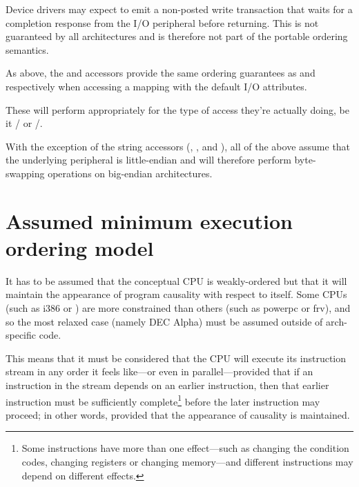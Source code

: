 \begin{description}
	Device drivers may expect  to emit a non-posted write
	transaction that waits for a completion response from the I/O
	peripheral before returning.
	This is not guaranteed by all architectures and is therefore not
	part of the portable ordering semantics.

 \item[\tco{insX()}, \tco{outsX()}:]

	As above, the  and  accessors provide the same
	ordering guarantees as  and  respectively
	when accessing a mapping with the default I/O attributes.

 \item[\tco{ioreadX()}, \tco{iowriteX()}:]

	These will perform appropriately for the type of access they're actually
	doing, be it / or /.
\end{description}

With the exception of the string accessors (, ,
 and ), all of the above assume that the underlying
peripheral is little-endian and will therefore perform byte-swapping
operations on big-endian architectures.


\section{Assumed minimum execution ordering model}

It has to be assumed that the conceptual CPU is weakly-ordered but that it will
maintain the appearance of program causality with respect to itself.
Some CPUs (such as i386 or ) are more constrained than others
(such as powerpc or frv), and so the most relaxed case (namely DEC Alpha)
must be assumed outside of arch-specific code.

This means that it must be considered that the CPU will execute its instruction
stream in any order it feels like---or even in parallel---provided that if an
instruction in the stream depends on an earlier instruction, then that
earlier instruction must be sufficiently complete\footnote{
	Some instructions have more than one effect---such as changing the
	condition codes, changing registers or changing memory---and
	different instructions may depend on different effects.}
before the later instruction may proceed; in other words, provided that the
appearance of causality is maintained.

